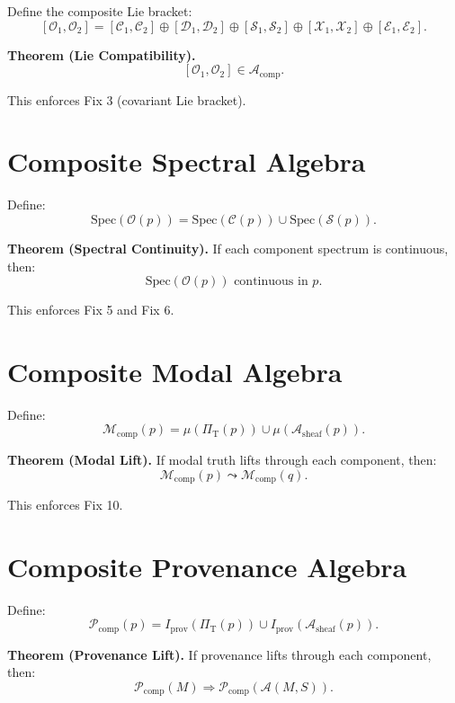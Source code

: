 \documentclass[11pt]{article}
\begin{document}
Define the composite Lie bracket:
\[
[\mathcal{O}_1, \mathcal{O}_2]
=
[\mathcal{C}_1, \mathcal{C}_2]
\oplus
[\mathcal{D}_1, \mathcal{D}_2]
\oplus
[\mathcal{S}_1, \mathcal{S}_2]
\oplus
[\mathcal{X}_1, \mathcal{X}_2]
\oplus
[\mathcal{E}_1, \mathcal{E}_2].
\]

\textbf{Theorem (Lie Compatibility).}
\[
[\mathcal{O}_1, \mathcal{O}_2] \in \mathcal{A}_{\mathrm{comp}}.
\]

This enforces Fix 3 (covariant Lie bracket).

\section{Composite Spectral Algebra}

Define:
\[
\mathrm{Spec}(\mathcal{O}(p)) =
\mathrm{Spec}(\mathcal{C}(p))
\cup
\mathrm{Spec}(\mathcal{S}(p)).
\]

\textbf{Theorem (Spectral Continuity).}
If each component spectrum is continuous, then:
\[
\mathrm{Spec}(\mathcal{O}(p)) \text{ continuous in } p.
\]

This enforces Fix 5 and Fix 6.

\section{Composite Modal Algebra}

Define:
\[
\mathcal{M}_{\mathrm{comp}}(p) =
\mu(\Pi_{\mathrm{T}}(p))
\cup
\mu(\mathcal{A}_{\mathrm{sheaf}}(p)).
\]

\textbf{Theorem (Modal Lift).}
If modal truth lifts through each component, then:
\[
\mathcal{M}_{\mathrm{comp}}(p) \leadsto \mathcal{M}_{\mathrm{comp}}(q).
\]

This enforces Fix 10.

\section{Composite Provenance Algebra}

Define:
\[
\mathcal{P}_{\mathrm{comp}}(p) =
I_{\mathrm{prov}}(\Pi_{\mathrm{T}}(p))
\cup
I_{\mathrm{prov}}(\mathcal{A}_{\mathrm{sheaf}}(p)).
\]

\textbf{Theorem (Provenance Lift).}
If provenance lifts through each component, then:
\[
\mathcal{P}_{\mathrm{comp}}(M) \Rightarrow
\mathcal{P}_{\mathrm{comp}}(\mathcal{A}(M,S)).
\]
\end{document}
